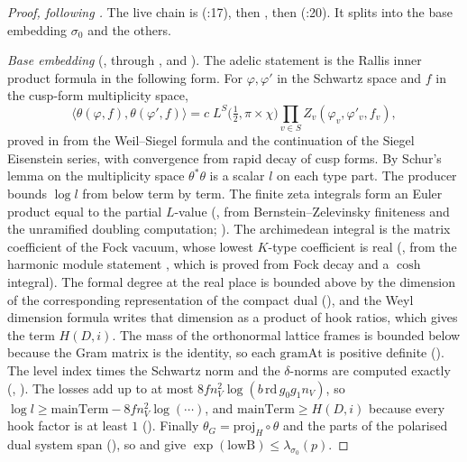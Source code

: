\documentclass[11pt]{article}
\theoremstyle{remark}
\begin{document}
\begin{proof}[Proof, following ]
The live chain is  (:17), then , then  (:20). It splits into the base embedding $\sigma_0$ and the others.

\emph{Base embedding} (, through ,  and ). The adelic statement  is the Rallis inner product formula in the following form. For $\varphi,\varphi'$ in the Schwartz space and $f$ in the cusp-form multiplicity space,
\[
\langle\theta(\varphi,f),\theta(\varphi',f)\rangle=c\;L^S\!\bigl(\tfrac12,\pi\times\chi\bigr)\prod_{v\in S}Z_v(\varphi_v,\varphi'_v,f_v),
\]
proved in  from the Weil--Siegel formula and the continuation of the Siegel Eisenstein series, with convergence from rapid decay of cusp forms. By Schur's lemma on the multiplicity space $\theta^*\theta$ is a scalar $l$ on each type part. The producer  bounds $\log l$ from below term by term. The finite zeta integrals form an Euler product equal to the partial $L$-value (, from Bernstein--Zelevinsky finiteness and the unramified doubling computation; ). The archimedean integral is the matrix coefficient of the Fock vacuum, whose lowest $K$-type coefficient is real (, from the harmonic module statement , which is proved from Fock decay and a $\cosh$ integral). The formal degree at the real place is bounded above by the dimension of the corresponding representation of the compact dual (), and the Weyl dimension formula writes that dimension as a product of hook ratios, which gives the term $H(D,i)$. The mass of the orthonormal lattice frames is bounded below because the Gram matrix is the identity, so each $\mathrm{gramAt}$ is positive definite (). The level index times the Schwartz norm and the $\delta$-norms are computed exactly (, ). The losses add up to at most $8fn_V^2\log(b\,\mathrm{rd}\,g_0g_1n_V)$, so $\log l\ge\mathrm{mainTerm}-8fn_V^2\log(\cdots)$, and $\mathrm{mainTerm}\ge H(D,i)$ because every hook factor is at least $1$ (). Finally $\theta_G=\mathrm{proj}_H\circ\theta$ and the parts of the polarised dual system span (), so  and  give $\exp(\mathrm{lowB})\le\lambda_{\sigma_0}(p)$.


\end{proof}
\end{document}
